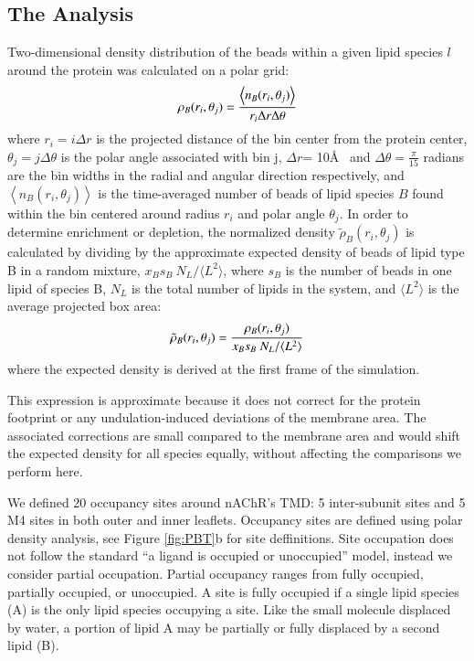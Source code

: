 \documentclass[preprint,3p,9pt,times,onecolumn]{elsarticle}
\newcommand{\nachr}{nAChR}
\begin{document}
\subsection{The Analysis}

Two-dimensional density distribution of the beads within a given lipid species $l$ around the protein was calculated on a polar grid:
  \begin{equation}
      \rho_{B}(r_i,\theta_j)= \frac{\left\langle n_{B}(r_i,\theta_j) \right\rangle}{r_i \Delta{r}\Delta{\theta}} \\        
    \label{eq:R}
  \end{equation}
  where  $r_i = i \Delta{r}$ is the projected distance of the bin center from the protein center, $\theta_j = j \Delta{\theta}$ is the polar angle associated with bin j,  $\Delta{r}$= 10\AA~ and  $\Delta{\theta} = \frac{\pi}{15}$ radians are the bin widths in the radial and angular direction respectively, and $\left\langle n_{B}(r_i,\theta_j) \right\rangle$ is the time-averaged number of beads of lipid species $B$ found within the bin centered around radius $r_{i}$ and polar angle $\theta_{j}$.  In order to determine enrichment or depletion, the normalized density $ \tilde{\rho}_{B}(r_i,\theta_j)$ is calculated by dividing by the approximate expected density of beads of lipid type B in a random mixture, $x_{B}s_{B}~N_{L}/\langle L^{2}\rangle$, where $s_{B}$ is the number of beads in one lipid of species B, $N_{L}$ is the total number of lipids in the system, and $\langle L^{2}\rangle$ is the average projected box area:
  \begin{equation}
  \tilde{\rho}_{B}(r_i,\theta_j)=\frac{ \rho_{B}(r_i,\theta_j)}{x_{B}s_{B}~N_{L}/\langle L^{2}\rangle} \\        
    \label{eq:Rt}
  \end{equation}
where the expected density is derived at the first frame of the simulation.
 
 
This expression is approximate because it does not correct for the protein footprint or any undulation-induced deviations of the membrane area.  The associated corrections are small compared to the membrane area and would shift the expected density for all species equally, without affecting the comparisons we perform here. 

We defined 20 occupancy sites around \nachr's TMD: 5 inter-subunit sites and 5 M4 sites in both outer and inner leaflets. Occupancy sites are defined using polar density analysis, see Figure \ref{fig:PBT}b for site deffinitions. Site occupation does not follow the standard ``a ligand is occupied or unoccupied'' model, instead we consider partial occupation. Partial occupancy ranges from fully occupied, partially occupied, or unoccupied. A site is fully occupied if a single lipid species (A) is the only lipid species occupying a site. Like the small molecule displaced by water, a portion of lipid A may be partially or fully displaced by a second lipid (B).  
\end{document}
